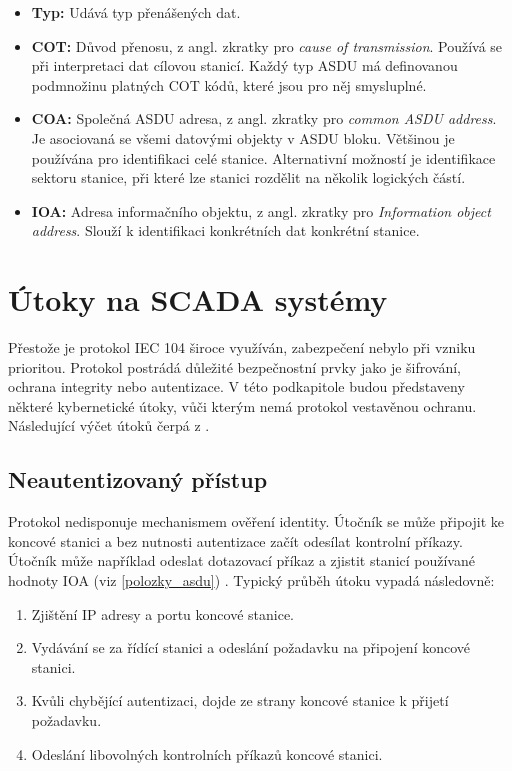 \begin{itemize}
    \item \textbf{Typ:} Udává typ přenášených dat.
    \item \textbf{COT:} Důvod přenosu, z angl. zkratky pro \emph{cause of transmission}. Používá se při interpretaci dat cílovou stanicí. Každý typ ASDU má definovanou podmnožinu platných COT kódů, které jsou pro něj smysluplné.
    \item \textbf{COA:} Společná ASDU adresa, z angl. zkratky pro \emph{common ASDU address}. Je asociovaná se všemi datovými objekty v ASDU bloku. Většinou je používána pro identifikaci celé stanice. Alternativní možností je identifikace sektoru stanice, při které lze stanici rozdělit na několik logických částí.
    \item \textbf{IOA:} Adresa informačního objektu, z angl. zkratky pro \emph{Information object address}. Slouží k identifikaci konkrétních dat konkrétní stanice.
\end{itemize}


\section{Útoky na SCADA systémy}
\label{scada_attacks}

Přestože je protokol IEC 104 široce využíván, zabezpečení nebylo při vzniku prioritou. Protokol postrádá důležité bezpečnostní prvky jako je šifrování, ochrana integrity nebo autentizace. V této podkapitole budou představeny některé kybernetické útoky, vůči kterým nemá protokol vestavěnou ochranu. Následující výčet útoků čerpá z \cite{scada_attack}.



\subsection*{Neautentizovaný přístup}
\label{unauthorized_access}


Protokol nedisponuje mechanismem ověření identity. Útočník se může připojit ke koncové stanici a bez nutnosti autentizace začít odesílat kontrolní příkazy. Útočník může například odeslat dotazovací příkaz a zjistit stanicí používané hodnoty IOA (viz \ref{polozky_asdu}) . Typický průběh útoku vypadá následovně:


\begin{enumerate}
    \item Zjištění IP adresy a portu koncové stanice.
    \item Vydávání se za řídící stanici a odeslání požadavku na připojení koncové stanici.
    \item Kvůli chybějící autentizaci, dojde ze strany koncové stanice k přijetí požadavku.
    \item Odeslání libovolných kontrolních příkazů koncové stanici.
\end{enumerate}


